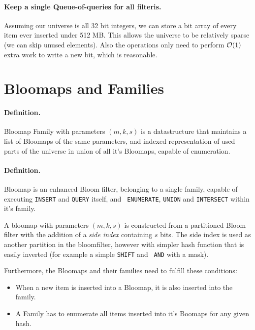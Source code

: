 \paragraph{Keep a single Queue-of-queries for all filteris.}

Assuming our universe is all 32 bit integers, we can store a bit array of every
item ever inserted under 512 MB. This allows the universe to be relatively
sparse (we can skip unused elements). Also the operations only need to perform
$\mathcal{O}(1)$ extra work to write a new bit, which is reasonable.

\section{Bloomaps and Families}

\paragraph{Definition.} Bloomap Family with parameters $(m, k, s)$ is a
datastructure that maintains a list of Bloomaps of the same parameters, and
indexed representation of used parts of the universe in union of all it's
Bloomaps, capable of enumeration.

\paragraph{Definition.} Bloomap is an enhanced Bloom filter, belonging to a single
family, capable of executing {\tt INSERT} and {\tt QUERY} itself, and {\tt
ENUMERATE}, {\tt UNION} and {\tt INTERSECT} within it's family.

A bloomap with parameters $(m, k, s)$ is constructed from a partitioned Bloom
filter with the addition of a {\it side index} containing $s$ bits. The side
index is used as another partition in the bloomfilter, however with simpler hash
function that is easily inverted (for example a simple {\tt SHIFT} and {\tt
AND} with a mask).

Furthermore, the Bloomaps and their families need to fulfill these conditions:

\begin{itemize}
	\item When a new item is inserted into a Bloomap, it is also inserted into
		the family.
	\item A Family has to enumerate all items inserted into it's Boomaps for any
		given hash.
\end{itemize}

